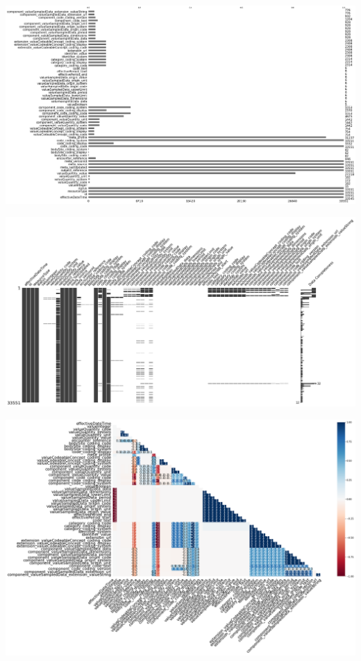 \documentclass[11pt, oneside]{article}
\begin{document}
\begin{center}
\includegraphics[scale=0.2]{bars.png}
\end{center}
\begin{center}
\includegraphics[scale=0.2]{matrix.png}
\end{center}
\begin{center}
\includegraphics[scale=0.2]{heatmap.png}
\end{center}
\end{document}
